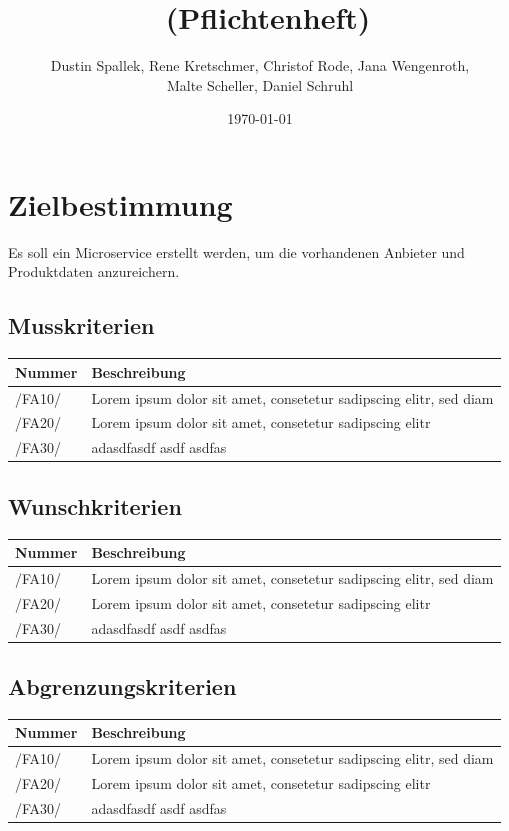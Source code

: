 \documentclass[a4paper,12pt]{article}
\title{\projektName~(Pflichtenheft)}
\author{Dustin Spallek, Rene Kretschmer, Christof Rode, Jana Wengenroth, \\Malte Scheller, Daniel Schruhl}
\date{\today}
\newcommand\addrow[2]{#1 &#2\\ }
\newcommand\addheading[2]{#1 &#2\\ \hline}
\newcommand\tabularhead{\begin{tabular}{lp{13cm}}
\hline
}
\newenvironment{usecase}{\tabularhead}
{\hline\end{tabular}}
\begin{document}
 \setcounter{page}{2}
 \tableofcontents          %
 \clearpage
 
\section{Zielbestimmung}

Es soll ein Microservice erstellt werden, um die vorhandenen Anbieter und Produktdaten anzureichern.

\subsection{Musskriterien}
\begin{usecase}
  \addheading{Nummer}{Beschreibung} 
  \addrow{/FA10/}{Lorem ipsum dolor sit amet, consetetur sadipscing elitr, sed diam}
  \addrow{/FA20/}{Lorem ipsum dolor sit amet, consetetur sadipscing elitr}
  \addrow{/FA30/}{adasdfasdf asdf asdfas}
\end{usecase}

\subsection{Wunschkriterien}
\begin{usecase}
  \addheading{Nummer}{Beschreibung} 
  \addrow{/FA10/}{Lorem ipsum dolor sit amet, consetetur sadipscing elitr, sed diam}
  \addrow{/FA20/}{Lorem ipsum dolor sit amet, consetetur sadipscing elitr}
  \addrow{/FA30/}{adasdfasdf asdf asdfas}
\end{usecase}

\subsection{Abgrenzungskriterien}
\begin{usecase}
  \addheading{Nummer}{Beschreibung} 
  \addrow{/FA10/}{Lorem ipsum dolor sit amet, consetetur sadipscing elitr, sed diam}
  \addrow{/FA20/}{Lorem ipsum dolor sit amet, consetetur sadipscing elitr}
  \addrow{/FA30/}{adasdfasdf asdf asdfas}
\end{usecase}
\end{document}
